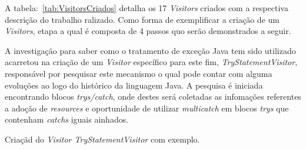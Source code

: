 A tabela:~\ref{tab:VisitorsCriados} detalha os 17 \textit{Visitors} criados com a respectiva descrição do trabalho ralizado. Como forma de exemplificar a criação de um \textit{Visitors}, etapa a qual é composta de 4 passos quo serão demonstrados a seguir.

A investigação para saber como o tratamento de exceção Java tem sido utilizado acarretou na criação de um \textit{Visitor} específico para este fim, \textit{TryStatementVisitor}, responsável por pesquisar este mecanismo o qual pode contar com alguma evoluções ao logo do histórico da linguagem Java. A pesquisa é iniciada encontrando blocos \textit{trys/catch}, onde destes será coletadas as infomações referentes a adoção de \textit{resources} e oportunidade de utilizar \textit{multicatch} em blocos \textit{trys} que contenham \textit{catchs} iguais ainhados.

Criaçãd do \textit{Visitor TryStatementVisitor} com exemplo.

